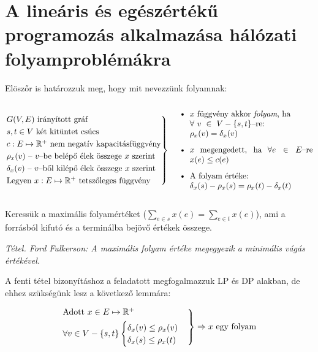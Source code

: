 \section{A lineáris és egészértékű programozás alkalmazása hálózati folyamproblémákra}

Elöszőr is határozzuk meg, hogy mit nevezzünk folyamnak:

\[
	\begin{rcases}
		G(V,E) \mbox{ irányított gráf}                                               \\
		s,t \in V \mbox{ két kitüntet csúcs}                                         \\
		c : E \mapsto \mathbb{R}^+ \mbox{ nem negatív kapacitásfüggvény}             \\
		\rho_x(v) \mbox{ -- } v\mbox{--be belépő élek összege } x \mbox{ szerint}    \\
		\delta_x(v) \mbox{ -- } v\mbox{--ből kilépő élek összege } x \mbox{ szerint} \\
		\mbox{Legyen }x : E \mapsto \mathbb{R}^+ \mbox{ tetszőleges függvény}
	\end{rcases} \parbox[c]{6.2cm}{
		\begin{itemize}
			\item $x$ függvény akkor \emph{folyam}, ha \\ $\forall~v~\in~V - \{s,t\}$--re: \\ $\rho_x(v)=\delta_x(v)$
			\item $x$ megengedett, ha $\forall e \in E$--re $x(e) \leq c(e)$
			\item A folyam értéke: \\ $\delta_x(s)-\rho_x(s)=\rho_x(t)-\delta_x(t)$
		\end{itemize}
	}
\]

Keressük a maximális folyamértéket ($\sum_{e \in s}x(e)=\sum_{e \in t}x(e)$),
ami a forrásból kifutó és a terminálba bejövő értékek összege.

\vspace{0.4cm}
\emph{Tétel. Ford Fulkerson: A maximális folyam értéke megegyezik a minimális vágás értékével.}
\vspace{0.4cm}

A fenti tétel bizonyításhoz a feladatott megfogalmazzuk LP és DP alakban, de
ehhez szükségünk lesz a következő lemmára:

\[
	\begin{rcases}
		\mbox{Adott } x \in E \mapsto \mathbb{R}^+ \\
		\forall v \in V - \{s,t\} \begin{cases}
			                          \delta_x(v) \leq \rho_x(v) \\
			                          \delta_x(s) \leq \rho_x(t)
		                          \end{cases}
	\end{rcases}
	\Rightarrow  x \mbox{ egy folyam}
\]

